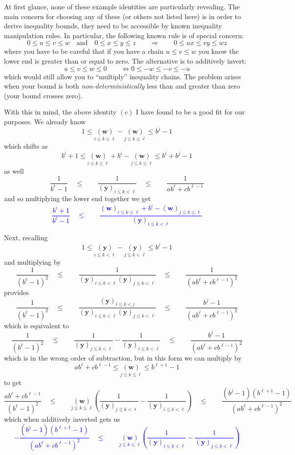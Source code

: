 \documentclass[twoside]{article}
\renewcommand{\leq}{\ensuremath{\quad\le\qquad}}
\newcommand{\bradix}[2][u]{\ensuremath{\underset{#2}{(\bm{#1})}}}
\newcommand{\numer}[3][w]{\ensuremath{(\bm{#1})_{#2\le k\le #3}}}
\newcommand{\denom}[3][y]{\ensuremath{(\bm{#1})_{#2\le k <  #3}}}
\begin{document}
At first glance, none of these example identities are particularly revealing. The main concern for choosing any of these
(or others not listed here) is in order to derive inequality bounds, they need to be accessible by known inequality manipulation
rules. In particular, the following known rule is of special concern:
$$ 0\le u\le v\le w\quad\mbox{and}\quad 0\le x\le y\le z\qquad\Longrightarrow\qquad 0\le ux\le vy\le wz $$
where you have to be careful that if you have a chain $ u\le v\le w $ you know the lower end is greater than
or equal to zero. The alternative is to additively invert:
$$ u\le v\le w\le 0\qquad\Longleftrightarrow 0\le -w\le -v\le -u $$
which would still allow you to ``multiply'' inequality chains. The problem arises when your bound is both \emph{non-deterministically}
less than and greater than zero (your bound crosses zero).

With this in mind, the above identity $ (c) $ I have found to be a good fit for our purposes.  We already know 
$$ 1\le\bradix[w]{i\le k\le\ell}-\bradix[w]{j\le k\le\ell}\le b^j-1 $$
which shifts as
$$ b^i+1\le\bradix[w]{i\le k\le\ell}+b^i-\bradix[w]{j\le k\le\ell}\le b^i+b^j-1 $$
as well
$$ \frac{1}{b^\ell-1}
	\leq\frac{1}{\denom{i}{\ell}}
	\leq\frac{1}{ab^\ell+cb^{\ell-1}} $$
and so multiplying the lower end together we get
\textcolor{blue}{
$$ \frac{b^i+1}{b^\ell-1}
	\leq\frac{\numer{i}{\ell}+b^i-\numer{j}{\ell}}{\denom{i}{\ell}} $$
}

Next, recalling
$$ 1\le\bradix[y]{i\le k < \ell}-\bradix[y]{j\le k < \ell}\le b^j-1 $$
and multiplying by
$$ \frac{1}{(b^\ell-1)^2}
	\leq\frac{1}{\denom{i}{\ell}\denom{j}{\ell}}
	\leq\frac{1}{(ab^\ell+cb^{\ell-1})^2} $$
provides
$$ \frac{1}{(b^\ell-1)^2}
	\leq\frac{\denom{i}{j}}{\denom{i}{\ell}\denom{j}{\ell}}
	\leq\frac{b^j-1}{(ab^\ell+cb^{\ell-1})^2} $$
which is equivalent to
$$ \frac{1}{(b^\ell-1)^2}
	\leq\frac{1}{\denom{j}{\ell}}-\frac{1}{\denom{i}{\ell}}
	\leq\frac{b^j-1}{(ab^\ell+cb^{\ell-1})^2} $$
which is in the wrong order of subtraction, but in this form we can multiply by
$$ ab^\ell+cb^{\ell-1}\le\bradix[w]{j\le k\le\ell}\le b^{\ell+1}-1 $$
to get
$$ \frac{ab^\ell+cb^{\ell-1}}{(b^\ell-1)^2}
	\leq\bradix[w]{j\le k\le\ell}\left(\frac{1}{\denom{j}{\ell}}-\frac{1}{\denom{i}{\ell}}\right)
	\leq\frac{(b^j-1)(b^{\ell+1}-1)}{(ab^\ell+cb^{\ell-1})^2} $$
which when additively inverted gets us
\textcolor{blue}{
$$ -\frac{(b^j-1)(b^{\ell+1}-1)}{(ab^\ell+cb^{\ell-1})^2}
	\leq\bradix[w]{j\le k\le\ell}\left(\frac{1}{\denom{i}{\ell}}-\frac{1}{\denom{j}{\ell}}\right) $$
}
\end{document}
